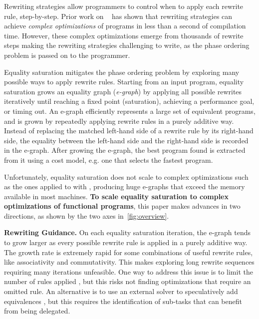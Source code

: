 Rewriting strategies \cite{visser1998-strategies} allow programmers to control when to apply each rewrite rule, step-by-step.
Prior work on \Elevate{}~\cite{hagedorn2020-elevate} has shown that rewriting strategies can achieve \emph{complex optimizations} of \Rise{} programs in less than a second of compilation time.
However, these complex optimizations emerge from thousands of rewrite steps making the rewriting strategies challenging to write, as the phase ordering problem is passed on to the programmer.

\vspace{8em}

Equality saturation \cite{tate2009-equality-saturation, willsey2021-egg} mitigates the phase ordering problem by exploring many possible ways to apply rewrite rules.
Starting from an input program, equality saturation grows an equality graph (\emph{e-graph}) by applying all possible rewrites iteratively until reaching a fixed point (saturation), achieving a performance goal, or timing out.
An e-graph efficiently represents a large set of equivalent programs, and is grown by repeatedly applying rewrite rules in a purely additive way.
Instead of replacing the matched left-hand side of a rewrite rule by its right-hand side, the equality between the left-hand side and the right-hand side is recorded in the e-graph.
After growing the e-graph, the best program found is extracted from it using a cost model, e.g. one that selects the fastest program.

Unfortunately, equality saturation does not scale to complex optimizations such as the ones applied to \Rise{} with \Elevate{}, producing huge e-graphs that exceed the memory available in most machines.
\textbf{To scale equality saturation to complex optimizations of functional programs}, this paper makes advances in two directions, as shown by the two axes in~\cref{fig:overview}.

\textbf{Rewriting Guidance.}
On each equality saturation iteration, the e-graph tends to grow larger as every possible rewrite rule is applied in a purely additive way. 
The growth rate is extremely rapid for some combinations of useful rewrite rules, like associativity and commutativity.
This makes exploring long rewrite sequences requiring many iterations unfeasible.
One way to address this issue is to limit the number of rules applied \cite{wang2020-spores, willsey2021-egg}, but this risks not finding optimizations that require an omitted rule.
An alternative is to use an external solver to speculatively add equivalences \cite{nandi2020-synthesizing-CAD}, but this requires the identification of sub-tasks that can benefit from being delegated.

